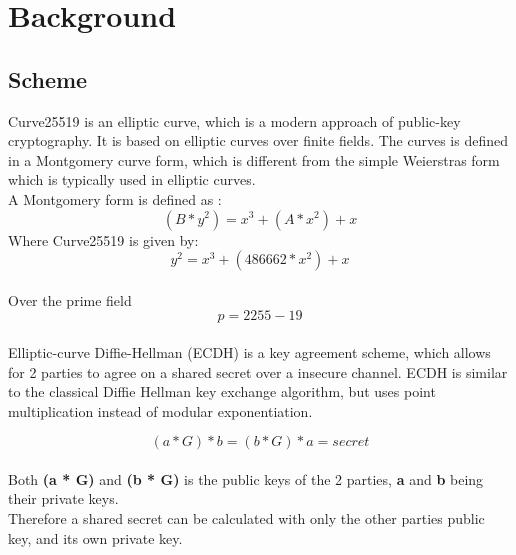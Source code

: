 %
\section{Background}
\subsection{Scheme}
Curve25519 is an elliptic curve, which is a modern approach of public-key cryptography. It is based on elliptic curves over finite fields.
The curves is defined in a Montgomery curve form, which is different from the simple Weierstras form which is typically used in elliptic curves.\\
A Montgomery form is defined as \cite{cryptobook}:\\
\[(B * y^2) = x^3 + (A * x^2) + x\]
Where Curve25519 is given by:\\
\[y^2 = x^3 + (486662 * x^2) + x\]\\
Over the prime field 
\[p = 2255 - 19\]\\
Elliptic-curve Diffie-Hellman (ECDH) is a key agreement scheme, which allows for 2 parties to agree on a shared secret over a insecure channel.
ECDH is similar to the classical Diffie Hellman key exchange algorithm, but uses point multiplication instead of modular exponentiation.

\[(a * G) * b = (b * G) * a = secret\]\\
Both \textbf{(a * G)} and \textbf{(b * G)} is the public keys of the 2 parties, \textbf{a} and \textbf{b} being their private keys.\\
Therefore a shared secret can be calculated with only the other parties public key, and its own private key.



\pagebreak

